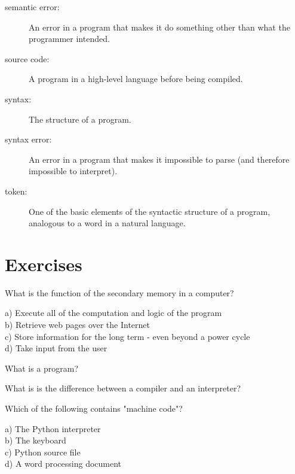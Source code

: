 \documentclass[10pt]{book}
\begin{document}
\begin{description}
\item[semantic error:]   An error in a program that makes it do something
other than what the programmer intended.

\item[source code:]  A program in a high-level language before
being compiled.

\item[syntax:]  The structure of a program.

\item[syntax error:]  An error in a program that makes it impossible
to parse (and therefore impossible to interpret).

\item[token:]  One of the basic elements of the syntactic structure of
a program, analogous to a word in a natural language.



\end{description}


\section{Exercises}


\begin{ex}
What is the function of the secondary memory in a computer?

a) Execute all of the computation and logic of the program\\
b) Retrieve web pages over the Internet\\
c) Store information for the long term - even beyond a power cycle\\
d) Take input from the user 
\end{ex}

\begin{ex}
What is a program?
\end{ex}

\begin{ex}
What is is the difference between a compiler and an interpreter?
\end{ex}

\begin{ex}
Which of the following contains "machine code"?

a) The Python interpreter\\
b) The keyboard\\
c) Python source file\\
d) A word processing document
\end{ex}
\end{document}

